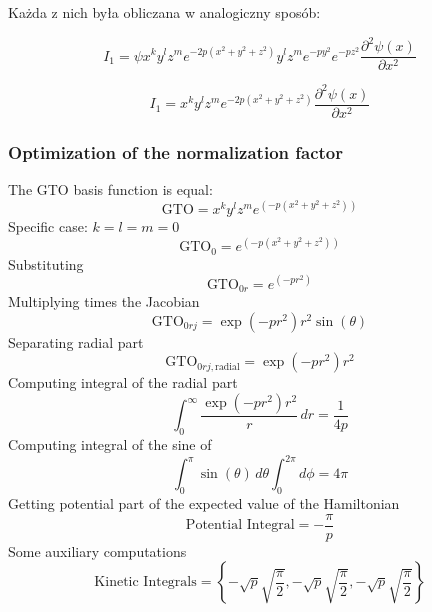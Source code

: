 Każda z nich była obliczana w analogiczny sposób:

\begin{equation}
	I_1 = \psi x^k y^l z^m e^{-2p(x^2+y^2+z^2)} y^l z^m e^{-py^2}e^{-pz^2} \frac{\partial^2\psi(x)}{\partial x^2}
\end{equation}

\begin{equation}
	I_1 = x^k y^l z^m e^{-2p(x^2+y^2+z^2)} \frac{\partial^2\psi(x)}{\partial x^2}
\end{equation}



\subsubsection{Optimization of the normalization factor}
The GTO basis function is equal:
\begin{equation}
	\text{GTO} = x^k y^l z^m e^{(-p(x^2 + y^2 + z^2))}
\end{equation}
Specific case: $k = l = m = 0$
\begin{equation}
	\text{GTO}_0 = e^{(-p(x^2 + y^2 + z^2))}
\end{equation}
Substituting
\begin{equation}
	\text{GTO}_{0r} = e^{(-pr^2)}
\end{equation}
Multiplying times the Jacobian
\begin{equation}
	\text{GTO}_{0rj} = \exp(-pr^2) r^2 \sin(\theta)
\end{equation}
Separating radial part
\begin{equation}
	\text{GTO}_{0rj,\text{radial}} = \exp(-pr^2) r^2
\end{equation}
Computing integral of the radial part
\begin{equation}
	\int_0^\infty \frac{\exp(-pr^2) r^2}{r} \, dr = \frac{1}{4p}
\end{equation}
Computing integral of the sine of \Theta
\begin{equation}
	\int_0^\pi \sin(\theta) \, d\theta \int_0^{2\pi} d\phi = 4\pi
\end{equation}
Getting potential part of the expected value of the Hamiltonian
\begin{equation}
	\text{Potential Integral} = - \frac{\pi}{p}
\end{equation}
Some auxiliary computations
\begin{equation}
	\text{Kinetic Integrals} = 
	\left\{
	-\sqrt{p} \sqrt{\frac{\pi}{2}}, 
	-\sqrt{p} \sqrt{\frac{\pi}{2}}, 
	-\sqrt{p} \sqrt{\frac{\pi}{2}}
	\right\}
\end{equation}


